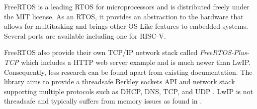 FreeRTOS is a leading RTOS for microprocessors and is distributed freely under the MIT license. As an RTOS, it provides an abstraction to the hardware that allows 
for multitasking and brings other OS-Like features to embedded systems. Several ports are available including one for RISC-V. 

FreeRTOS also provide their own TCP/IP network stack called \textit{FreeRTOS-Plus-TCP} which includes a HTTP web server example and is much newer than LwIP.
Consequently, less research can be found apart from existing documentation. The library aims to provide a threadsafe Berkley sockets API and network stack 
supporting multiple protocols such as DHCP, DNS, TCP, and UDP \cite{FreeRTOSTCP}. LwIP is not threadsafe and typically suffers from memory issues as found 
in \cite{OptimCortexLwIP}.


